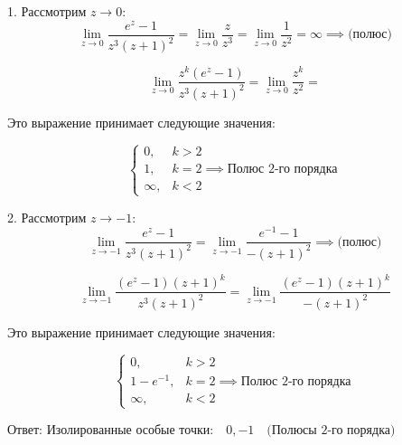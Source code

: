 \documentclass{article}
\begin{document}
1. Рассмотрим $z \to 0$:
\[
\lim_{z \to 0} \frac{e^z - 1}{z^3 (z + 1)^2} = \lim_{z \to 0} \frac{z}{z^3} = \lim_{z \to 0} \frac{1}{z^2} = \infty \implies \text{(полюс)}
\]

\[
\lim_{z \to 0} \frac{z^k(e^z - 1)}{z^3 (z + 1)^2} = \lim_{z \to 0} \frac{z^k}{z^2} =
\]

Это выражение принимает следующие значения:

\[
\begin{cases}
0, & k > 2 \\
1, & k = 2  \implies \text{Полюс 2-го порядка}\\
\infty, & k < 2
\end{cases}
\]

2. Рассмотрим $z \to -1$:
\[
\lim_{z \to -1} \frac{e^z - 1}{z^3 (z + 1)^2} = \lim_{z \to -1} \frac{e^{-1} - 1}{-(z + 1)^2}  \implies \text{(полюс)}
\]

\[
\lim_{z \to -1} \frac{(e^z - 1)(z + 1)^k}{z^3 (z + 1)^2} = \lim_{z \to -1} \frac{(e^z - 1)(z + 1)^k}{-(z + 1)^2}
\]

Это выражение принимает следующие значения:

\[
\begin{cases}
0, & k > 2 \\
1 - e^{-1}, & k = 2  \implies \text{Полюс 2-го порядка} \\
\infty, & k < 2
\end{cases}
\]


Ответ:
$
\text{Изолированные особые точки:} \quad 0, -1 \quad \text{(Полюсы 2-го порядка)}
$
\end{document}
